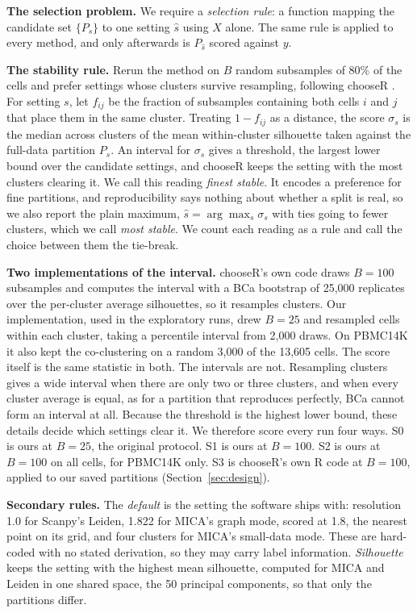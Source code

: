 \textbf{The selection problem.} We require a \emph{selection rule}: a function mapping the candidate
set $\{P_s\}$ to one setting $\hat{s}$ using $X$ alone. The same rule is applied to every method, and
only afterwards is $P_{\hat{s}}$ scored against $y$.

\textbf{The stability rule.} Rerun the method on $B$ random subsamples of $80\%$ of the cells and
prefer settings whose clusters survive resampling, following chooseR \cite{pattersoncross2021chooser}.
For setting $s$, let $f_{ij}$ be the fraction of subsamples containing both cells $i$ and $j$ that place
them in the same cluster. Treating $1 - f_{ij}$ as a distance, the score $\sigma_s$ is the median across
clusters of the mean within-cluster silhouette taken against the full-data partition $P_s$. An interval
for $\sigma_s$ gives a threshold, the largest lower bound over the candidate settings, and chooseR keeps
the setting with the most clusters clearing it. We call this reading \emph{finest stable}. It encodes a
preference for fine partitions, and reproducibility says nothing about whether a split is real, so we
also report the plain maximum, $\hat{s} = \arg\max_s \sigma_s$ with ties going to fewer clusters, which
we call \emph{most stable}. We count each reading as a rule and call the choice between them the
tie-break.

\textbf{Two implementations of the interval.} chooseR's own code draws $B = 100$ subsamples and
computes the interval with a BCa bootstrap of 25,000 replicates over the per-cluster average
silhouettes, so it resamples clusters. Our implementation, used in the exploratory runs, drew $B = 25$ and
resampled cells within each cluster, taking a percentile interval from 2,000 draws. On PBMC14K it also
kept the co-clustering on a random 3,000 of the 13,605 cells. The score itself is the same statistic in
both. The intervals are not. Resampling clusters gives a wide interval when there are only two or three
clusters, and when every cluster average is equal, as for a partition that reproduces perfectly, BCa
cannot form an interval at all. Because the threshold is the highest lower bound, these details decide
which settings clear it. We therefore score every run four ways. S0 is ours at $B = 25$, the
original protocol. S1 is ours at $B = 100$. S2 is ours at $B = 100$ on all cells, for PBMC14K only. S3
is chooseR's own R code at $B = 100$, applied to our saved partitions (Section~\ref{sec:design}).

\textbf{Secondary rules.} The \emph{default} is the setting the software ships with: resolution 1.0
for Scanpy's Leiden, 1.822 for MICA's graph mode, scored at 1.8, the nearest point on its grid, and
four clusters for MICA's small-data mode. These are hard-coded with no stated derivation, so they may
carry label information. \emph{Silhouette} keeps the setting with the highest mean silhouette, computed for MICA and Leiden in one shared space, the 50 principal components, so that only the partitions differ.

